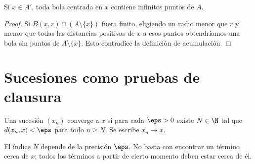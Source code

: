 \begin{lema}\label{ch03:infinitospuntos}
Si $x\in A'$, toda bola centrada en $x$ contiene infinitos puntos de $A$.
\end{lema}
\begin{proof}
Si $B(x,r)\cap(A\setminus\{x\})$ fuera finito, eligiendo un radio menor que $r$ y menor que todas las distancias positivas de $x$ a esos puntos obtendríamos una bola sin puntos de $A\setminus\{x\}$. Esto contradice la definición de acumulación.
\end{proof}

\section{Sucesiones como pruebas de clausura}
\begin{definicion}
Una sucesión $(x_n)$ converge a $x$ si para cada $\eps>0$ existe $N\in\N$ tal que $d(x_n,x)<\eps$ para todo $n\ge N$. Se escribe $x_n\to x$.
\end{definicion}
El índice $N$ depende de la precisión $\eps$. No basta con encontrar un término cerca de $x$; todos los términos a partir de cierto momento deben estar cerca de él.

